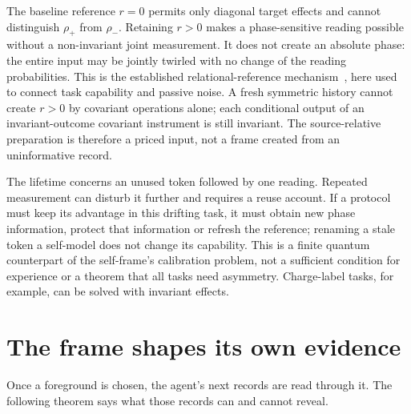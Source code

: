 \documentclass[12pt]{article}
\theoremstyle{definition}
\begin{document}
The baseline reference $r=0$ permits only diagonal target effects and
cannot distinguish $\rho_+$ from $\rho_-$. Retaining $r>0$ makes a
phase-sensitive reading possible without a non-invariant joint
measurement. It does not create an absolute phase: the entire input may
be jointly twirled with no change of the reading probabilities. This is
the established relational-reference mechanism~\cite{BRS2007}, here used
to connect task capability and passive noise. A fresh symmetric history
cannot create $r>0$ by covariant operations alone; each conditional
output of an invariant-outcome covariant instrument is still invariant.
The source-relative preparation is therefore a priced input, not a frame
created from an uninformative record.

The lifetime concerns an unused token followed by one reading. Repeated
measurement can disturb it further and requires a reuse account. If a
protocol must keep its advantage in this drifting task, it must obtain
new phase information, protect that information or refresh the reference;
renaming a stale token a self-model does not change its capability.
This is a finite quantum counterpart of the self-frame's calibration
problem, not a sufficient condition for experience or a theorem that
all tasks need asymmetry. Charge-label tasks, for example, can be solved
with invariant effects.

\section{The frame shapes its own evidence}
\label{sec:blind}

Once a foreground is chosen, the agent's next records are read through it. The following theorem says what those records can and cannot reveal.
\end{document}
